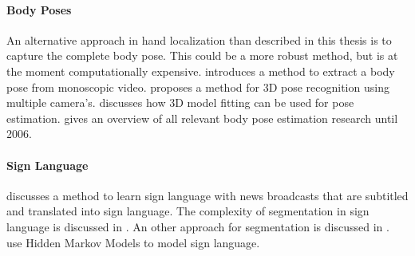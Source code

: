 \paragraph{Body Poses}
An alternative approach in hand localization than described in this thesis is to capture the complete body pose. This could be a more robust method, but is at the moment computationally expensive. \citep{ferrari2008} introduces a method to extract a body pose from monoscopic video. \citep{VandenBergh2009} proposes a method for 3D pose recognition using multiple camera's. \citep{Poppe2007} discusses how 3D model fitting can be used for pose estimation. \citep{Moeslund2006} gives an overview of all relevant body pose estimation research until 2006.


\paragraph{Sign Language}
\citep{Buehler2009} discusses a method to learn sign language with news broadcasts that are subtitled and translated into sign language. The complexity of segmentation in sign language is discussed in \citep{RichardBowden2004}. An other approach for segmentation is discussed in \citep{Cooper2007}. \citep{starner1998,Vogler1999} use Hidden Markov Models to model sign language.





